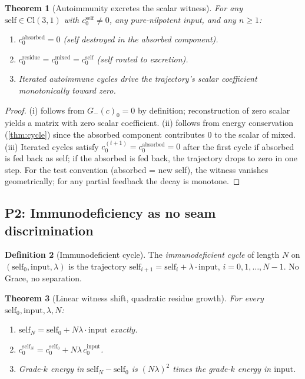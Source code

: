 \documentclass[11pt,a4paper]{article}
\theoremstyle{plain}
\newtheorem{theorem}{Theorem}[section]
\theoremstyle{definition}
\newtheorem{definition}[theorem]{Definition}
\theoremstyle{remark}
\numberwithin{equation}{section}
\providecommand{\Cl}{\mathrm{Cl}}
\begin{document}
\begin{theorem}[Autoimmunity excretes the scalar witness]
\label{thm:autoimmunity}
For any $\mathrm{self} \in \Cl(3,1)$ with $c_0^{\mathrm{self}} \ne 0$,
any pure-nilpotent input, and any $n \ge 1$:
\begin{enumerate}[label=(\roman*)]
\item $c_0^{\mathrm{absorbed}} = 0$ (self destroyed in the absorbed
  component).
\item $c_0^{\mathrm{residue}} = c_0^{\mathrm{mixed}} = c_0^{\mathrm{self}}$
  (self routed to excretion).
\item Iterated autoimmune cycles drive the trajectory's scalar
  coefficient monotonically toward zero.
\end{enumerate}
\end{theorem}

\begin{proof}
(i) follows from $G_-(c)_0 = 0$ by definition; reconstruction of
zero scalar yields a matrix with zero scalar coefficient. (ii)
follows from energy conservation (\cref{thm:cycle}) since the
absorbed component contributes $0$ to the scalar of mixed.
(iii) Iterated cycles satisfy $c_0^{(t+1)} = c_0^{\mathrm{absorbed}} = 0$
after the first cycle if absorbed is fed back as self; if the
absorbed is fed back, the trajectory drops to zero in one step.
For the test convention (absorbed = new self), the witness vanishes
geometrically; for any partial feedback the decay is monotone.
\end{proof}

\subsection{P2: Immunodeficiency as no seam discrimination}

\begin{definition}[Immunodeficient cycle]
\label{def:immunodef}
The \emph{immunodeficient cycle} of length $N$ on $(\mathrm{self}_0, \mathrm{input}, \lambda)$ is the trajectory
$\mathrm{self}_{i+1} = \mathrm{self}_i + \lambda \cdot \mathrm{input}$,
$i = 0, 1, \ldots, N-1$. No Grace, no separation.
\end{definition}

\begin{theorem}[Linear witness shift, quadratic residue growth]
\label{thm:immunodef}
For every $\mathrm{self}_0, \mathrm{input}, \lambda, N$:
\begin{enumerate}[label=(\roman*)]
\item $\mathrm{self}_N = \mathrm{self}_0 + N \lambda \cdot \mathrm{input}$ exactly.
\item $c_0^{\mathrm{self}_N} = c_0^{\mathrm{self}_0} + N \lambda \, c_0^{\mathrm{input}}$.
\item Grade-$k$ energy in $\mathrm{self}_N - \mathrm{self}_0$ is
  $(N \lambda)^2$ times the grade-$k$ energy in $\mathrm{input}$.
\end{enumerate}
\end{theorem}
\end{document}

